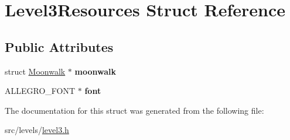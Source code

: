 \hypertarget{structLevel3Resources}{\section{Level3\+Resources Struct Reference}
\label{structLevel3Resources}
}
\subsection*{Public Attributes}
\begin{DoxyCompactItemize}
\item 
\hypertarget{structLevel3Resources_a6e6221c7ef1a0943273f566b499bdbff}{struct \hyperlink{structMoonwalk}{Moonwalk} $\ast$ {\bfseries moonwalk}}\label{structLevel3Resources_a6e6221c7ef1a0943273f566b499bdbff}

\item 
\hypertarget{structLevel3Resources_a0119102c2127d5d9d32a43671e7a3fd7}{A\+L\+L\+E\+G\+R\+O\+\_\+\+F\+O\+N\+T $\ast$ {\bfseries font}}\label{structLevel3Resources_a0119102c2127d5d9d32a43671e7a3fd7}

\end{DoxyCompactItemize}


The documentation for this struct was generated from the following file\+:\begin{DoxyCompactItemize}
\item 
src/levels/\hyperlink{level3_8h}{level3.\+h}\end{DoxyCompactItemize}
